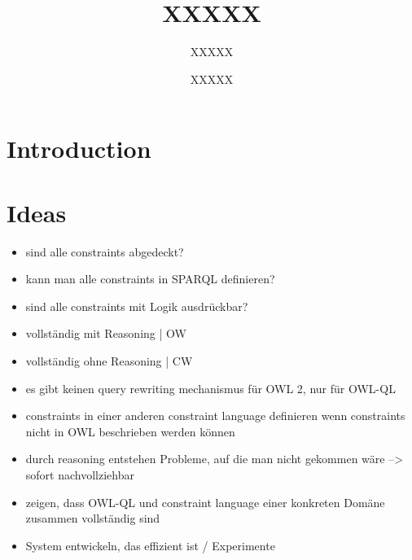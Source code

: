 \documentclass{llncs}
\begin{document}
%
%
\title{XXXXX}
%
%
\author{XXXXX \and XXXXX}
%
%

\maketitle              %

\begin{abstract}


\end{abstract}
%

\section{Introduction}



\section{Ideas}



\begin{itemize}
	\item sind alle constraints abgedeckt?
	\item kann man alle constraints in SPARQL definieren?
	\item sind alle constraints mit Logik ausdrückbar?
	\item vollständig mit Reasoning | OW
	\item vollständig ohne Reasoning | CW
	\item es gibt keinen query rewriting mechanismus für OWL 2, nur für OWL-QL
	\item constraints in einer anderen constraint language definieren wenn constraints nicht in OWL beschrieben werden können
	\item durch reasoning entstehen Probleme, auf die man nicht gekommen wäre --> sofort nachvollziehbar
	\item zeigen, dass OWL-QL und constraint language einer konkreten Domäne zusammen vollständig sind
	\item System entwickeln, das effizient ist / Experimente
\end{itemize}
\end{document}
